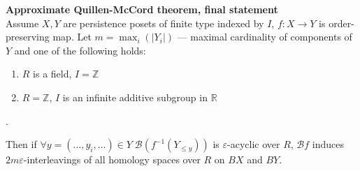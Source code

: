 \begin{theorem} \textbf{Approximate Quillen-McCord theorem, final statement}\\
  Assume $X, Y$ are persistence posets of finite type indexed by $I$, $f : X \to Y$ is order-preserving map. Let $m = \max_{i}(|Y_i|)$ --- maximal cardinality of components of $Y$ and one of the following holds:\\
  \begin{enumerate}
    \item $R$ is a field, $I = \mathbb{Z}$
    \item $R = \mathbb{Z}$, $I$ is an infinite additive subgroup in $\mathbb{R}$
  \end{enumerate}.

  Then if $\forall y=(\ldots,y_i,\ldots) \in Y\;\mathcal{B}(f^{-1}(Y_{\leqslant y}))$ is $\varepsilon$-acyclic over $R$, $\mathcal{B}f$ induces $2m\varepsilon$-interleavings of all homology spaces over $R$ on $BX$ and $BY$.\\
\end{theorem}

